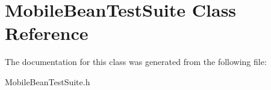 \hypertarget{interface_mobile_bean_test_suite}{
\section{\-Mobile\-Bean\-Test\-Suite \-Class \-Reference}
\label{interface_mobile_bean_test_suite}
}


\-The documentation for this class was generated from the following file\-:\begin{DoxyCompactItemize}
\item 
\-Mobile\-Bean\-Test\-Suite.\-h\end{DoxyCompactItemize}
